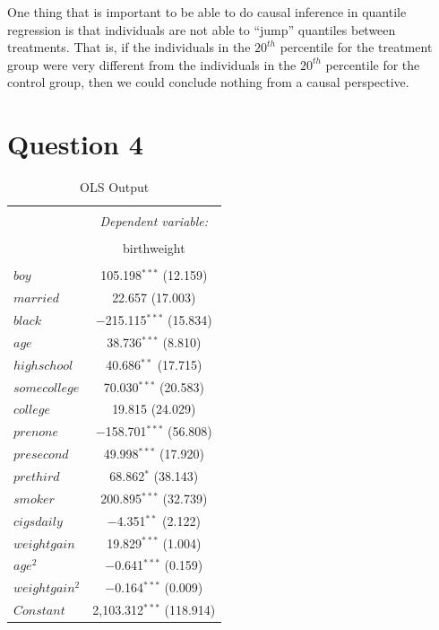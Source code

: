 \documentclass[12pt]{paper}
\begin{document}
One thing that is important to be able to do causal inference in
quantile regression is that individuals are not able to ``jump''
quantiles between treatments. That is, if the individuals in the
$20^{th}$ percentile for the treatment group were very different from
the individuals in the $20^{th}$ percentile for the control group,
then we could conclude nothing from a causal perspective.

\section*{Question 4}
\begin{table}[H] \centering 
  \caption{OLS Output} 
  \label{} 
\small 
\begin{tabular}{@{\extracolsep{5pt}}lc} 
\\[-1.8ex]\hline 
\hline \\[-1.8ex] 
 & \multicolumn{1}{c}{\textit{Dependent variable:}} \\ 
\cline{2-2} 
\\[-1.8ex] & birthweight \\ 
\hline \\[-1.8ex] 
$boy$ & 105.198$^{***}$ (12.159) \\ 
$married$ & 22.657 (17.003) \\ 
$black$ & $-$215.115$^{***}$ (15.834) \\ 
$age$ & 38.736$^{***}$ (8.810) \\ 
$highschool$ & 40.686$^{**}$ (17.715) \\ 
$somecollege$ & 70.030$^{***}$ (20.583) \\ 
$college$ & 19.815 (24.029) \\ 
$prenone$ & $-$158.701$^{***}$ (56.808) \\ 
$presecond$ & 49.998$^{***}$ (17.920) \\ 
$prethird$ & 68.862$^{*}$ (38.143) \\ 
$smoker$ & 200.895$^{***}$ (32.739) \\ 
$cigsdaily$ & $-$4.351$^{**}$ (2.122) \\ 
$weightgain$ & 19.829$^{***}$ (1.004) \\ 
  $age^2$ & $-$0.641$^{***}$ (0.159) \\ 
  $weightgain^2$ & $-$0.164$^{***}$ (0.009) \\ 
$Constant$ & 2,103.312$^{***}$ (118.914) \\ 

\end{tabular}
\end{table}
\end{document}
